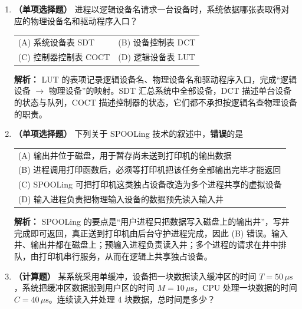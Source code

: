 \begin{enumerate}
\vspace{8pt}

\item \textbf{（单项选择题）} 进程以逻辑设备名请求一台设备时，系统依据哪张表取得对应的物理设备名和驱动程序入口？
\begin{center}
\begin{tabular}{ll}
(A) 系统设备表 SDT & (B) 设备控制表 DCT \\[4pt]
(C) 控制器控制表 COCT & (D) 逻辑设备表 LUT
\end{tabular}
\end{center}

\ifshowsolutions\par\noindent\textbf{解析：} LUT 的表项记录逻辑设备名、物理设备名和驱动程序入口，完成“逻辑设备 $\to$ 物理设备”的映射。SDT 汇总系统中全部设备，DCT 描述单台设备的状态与队列，COCT 描述控制器的状态，它们都不承担按逻辑名查物理设备的职责。\else \answerarea \fi

\vspace{8pt}

\item \textbf{（单项选择题）} 下列关于 SPOOLing 技术的叙述中，\textbf{错误}的是
\begin{center}
\begin{tabular}{l}
(A) 输出井位于磁盘，用于暂存尚未送到打印机的输出数据 \\[4pt]
(B) 进程调用打印函数后，必须等打印机把该任务全部输出完毕才能返回 \\[4pt]
(C) SPOOLing 可把打印机这类独占设备改造为多个进程共享的虚拟设备 \\[4pt]
(D) 输入进程负责把物理输入设备的数据预先读入输入井
\end{tabular}
\end{center}

\ifshowsolutions\par\noindent\textbf{解析：} SPOOLing 的要点是“用户进程只把数据写入磁盘上的输出井”，写井完成即可返回，真正送到打印机由后台守护进程完成，因此 (B) 错误。输入井、输出井都在磁盘上；预输入进程负责读入井；多个进程的请求在井中排队，由打印机串行服务，从而在逻辑上共享独占设备。\else \answerarea \fi

\vspace{8pt}

\item \textbf{（计算题）} 某系统采用单缓冲，设备把一块数据读入缓冲区的时间 $T=50\,\mu\text{s}$，系统把缓冲区数据搬到用户区的时间 $M=10\,\mu\text{s}$，CPU 处理一块数据的时间 $C=40\,\mu\text{s}$。连续读入并处理 4 块数据，总时间是多少？


\end{enumerate}
